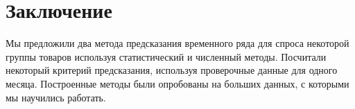\section{Заключение}

Мы предложили два метода предсказания временного ряда для спроса некоторой группы товаров используя статистический и численный методы. Посчитали некоторый критерий предсказания, используя проверочные данные для одного месяца. Построенные методы были опробованы на больших данных, с которыми мы научились работать.